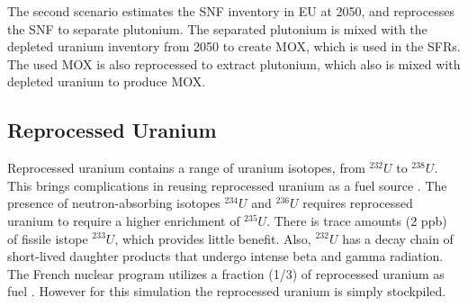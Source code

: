 The second scenario estimates the \gls{SNF} inventory in \gls{EU} at 2050,
and reprocesses the \gls{SNF} to separate plutonium. The separated
plutonium is mixed with the depleted uranium inventory from 2050
to create \gls{MOX}, which is used in the \gls{SFR}s. The used
\gls{MOX} is also reprocessed to extract plutonium, which also
is mixed with depleted uranium to produce \gls{MOX}.



\subsection{Reprocessed Uranium}
Reprocessed uranium contains a range of uranium isotopes, from $^{232}U$ to $^{238}U$.
This brings complications in reusing reprocessed uranium as a fuel source \cite{IAEA_management_2007}.
The presence of neutron-absorbing isotopes $^{234}U$ and $^{236}U$ requires reprocessed uranium
to require a higher enrichment of $^{235}U$. There is trace amounts (2 ppb) of fissile istope $^{233}U$,
which provides little benefit.  
Also, $^{232}U$ has a decay chain of short-lived
daughter products that undergo intense beta and gamma radiation.
The French nuclear program utilizes a fraction (1/3) of reprocessed uranium as fuel \cite{IAEA_management_200&}.
However for this simulation the reprocessed uranium is simply stockpiled.


